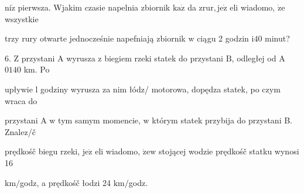 \documentclass[a4paper,12pt]{article}
\begin{document}
$\mathrm{n}\mathrm{i}\dot{\mathrm{z}}$ pierwsza. Wjakim czasie napelnia zbiornik $\mathrm{k}\mathrm{a}\dot{\mathrm{z}}$ da $\mathrm{z}\mathrm{r}\mathrm{u}\mathrm{r}, \mathrm{j}\mathrm{e}\dot{\mathrm{z}}$ eli wiadomo, $\dot{\mathrm{z}}\mathrm{e}$ wszystkie

trzy rury otwarte jednocześnie napefniają zbiornik $\mathrm{w}$ ciągu 2 godzin $\mathrm{i}40$ minut?

6. $\mathrm{Z}$ przystani A wyrusza $\mathrm{z}$ biegiem rzeki statek do przystani $\mathrm{B}$, odległej od A $0140$ km. Po

upływie l godziny wyrusza za nim łódz/ motorowa, dopędza statek, po czym wraca do

przystani A $\mathrm{w}$ tym samym momencie, $\mathrm{w}$ którym statek przybija do przystani B. Znalez/č

prędkośč biegu rzeki, $\mathrm{j}\mathrm{e}\dot{\mathrm{z}}$ eli wiadomo, $\dot{\mathrm{z}}\mathrm{e}\mathrm{w}$ stojącej wodzie prędkośč statku wynosi 16

$\mathrm{k}\mathrm{m}/$godz, a prędkośč łodzi 24 $\mathrm{k}\mathrm{m}/$godz.
\end{document}
